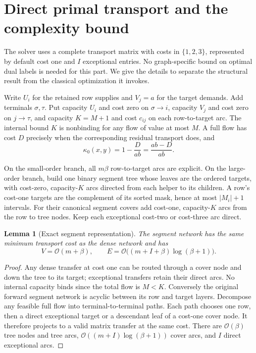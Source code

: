 \documentclass[11pt]{article}
\newtheorem{lemma}[theorem]{Lemma}
\theoremstyle{remark}
\newcommand{\Oh}{\mathcal O}
\begin{document}
\section{Direct primal transport and the complexity bound}\label{sec:runtime}

The solver uses a complete transport matrix with costs in $\{1,2,3\}$, represented by default cost one and $I$ exceptional entries. No graph-specific bound on optimal dual labels is needed for this part. We give the details to separate the structural result from the classical optimization it invokes.

Write $U_i$ for the retained row supplies and $V_j=a$ for the target demands. Add terminals $\sigma,\tau$. Put capacity $U_i$ and cost zero on $\sigma\to i$, capacity $V_j$ and cost zero on $j\to\tau$, and capacity $K=M+1$ and cost $c_{ij}$ on each row-to-target arc. The internal bound $K$ is nonbinding for any flow of value at most $M$. A full flow has cost $D$ precisely when the corresponding residual transport does, and
\begin{equation}\label{eq:output}
 \kappa_0(x,y)=1-\frac{D}{ab}=\frac{ab-D}{ab}.
\end{equation}

On the small-order branch, all $m\beta$ row-to-target arcs are explicit. On the large-order branch, build one binary segment tree whose leaves are the ordered targets, with cost-zero, capacity-$K$ arcs directed from each helper to its children. A row's cost-one targets are the complement of its sorted mask, hence at most $|M_i|+1$ intervals. For their canonical segment covers add cost-one, capacity-$K$ arcs from the row to tree nodes. Keep each exceptional cost-two or cost-three arc direct.

\begin{lemma}[Exact segment representation]\label{lem:sparse}
The segment network has the same minimum transport cost as the dense network and has
\[
 V=\Oh(m+\beta),\qquad
 E=\Oh\bigl((m+I+\beta)\log(\beta+1)\bigr).
\]
\end{lemma}
\begin{proof}
Any dense transfer at cost one can be routed through a cover node and down the tree to its target; exceptional transfers retain their direct arcs. No internal capacity binds since the total flow is $M<K$. Conversely the original forward segment network is acyclic between its row and target layers. Decompose any feasible full flow into terminal-to-terminal paths. Each path chooses one row, then a direct exceptional target or a descendant leaf of a cost-one cover node. It therefore projects to a valid matrix transfer at the same cost. There are $\Oh(\beta)$ tree nodes and tree arcs, $\Oh((m+I)\log(\beta+1))$ cover arcs, and $I$ direct exceptional arcs.
\end{proof}
\end{document}
